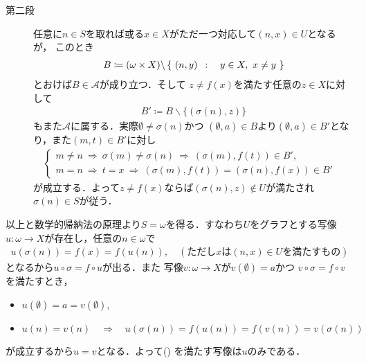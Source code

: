 \begin{prf}
\begin{description}
			\item[第二段] 
				任意に$n \in S$を取れば或る$x \in X$がただ一つ対応して$(n,x) \in U$となるが，
				このとき
				\begin{align}
					B \coloneqq (\omega \times X) \backslash \left\{\ (n,y)\ \, : \quad y \in X,\ x \neq y\ \right\}
				\end{align}
				とおけば$B \in \mathscr{A}$が成り立つ．そして
				$z \neq f(x)$を満たす任意の$z \in X$に対して
				\begin{align}
					B' \coloneqq B \backslash \{(\sigma(n),z)\}
				\end{align}
				もまた$\mathscr{A}$に属する．実際$\emptyset \neq \sigma(n)$かつ
				$(\emptyset,a) \in B$より$(\emptyset,a) \in B'$となり，また$(m,t) \in B'$に対し
				\begin{align}
					\begin{cases}
						m \neq n \ \Longrightarrow \ \sigma(m) \neq \sigma(n)
						\ \Longrightarrow\ (\sigma(m),f(t)) \in B', & \\
						m=n\ \Longrightarrow\ t = x\ \Longrightarrow
						\ (\sigma(m),f(t)) = (\sigma(n),f(x)) \in B'
					\end{cases}
				\end{align}
				が成立する．よって$z \neq f(x)$ならば$(\sigma(n),z) \notin U$が満たされ
				$\sigma(n) \in S$が従う．
		\end{description}
		以上と数学的帰納法の原理より$S = \omega$を得る．すなわち$U$をグラフとする写像
		$u:\omega \longrightarrow X$が存在し，任意の$n \in \omega$で
		\begin{align}
			u(\sigma(n)) = f(x) = f(u(n)),
			\quad (\mbox{ただし$x$は$(n,x) \in U$を満たすもの})
		\end{align}
		となるから$u \circ \sigma = f \circ u$が出る．また
		写像$v:\omega \longrightarrow X$が$v(\emptyset) = a$かつ
		$v \circ \sigma = f \circ v$を満たすとき，
		\begin{itemize}
			\item $u(\emptyset) = a = v(\emptyset)$,
			\item $u(n) = v(n) \quad \Longrightarrow \quad 
				u(\sigma(n)) = f(u(n)) = f(v(n)) = v(\sigma(n))$
		\end{itemize}
		が成立するから$u = v$となる．よって()
		を満たす写像は$u$のみである．
		\QED
	\end{prf}
